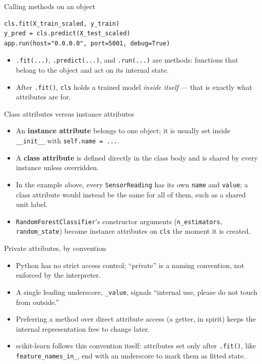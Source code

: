 \begin{frame}[fragile]{Calling methods on an object}
\begin{lstlisting}[style=coursepython]
cls.fit(X_train_scaled, y_train)
y_pred = cls.predict(X_test_scaled)
app.run(host="0.0.0.0", port=5001, debug=True)
\end{lstlisting}
\begin{itemize}
\item \texttt{.fit(...)}, \texttt{.predict(...)}, and \texttt{.run(...)} are methods: functions that belong to the object and act on its internal state.
\item After \texttt{.fit()}, \texttt{cls} holds a trained model \emph{inside itself} --- that is exactly what attributes are for.
\end{itemize}
\coursefooter
\end{frame}

\begin{frame}{Class attributes versus instance attributes}
\begin{itemize}
\item An \textbf{instance attribute} belongs to one object; it is usually set inside \texttt{\_\_init\_\_} with \texttt{self.name = ...}.
\item A \textbf{class attribute} is defined directly in the class body and is shared by every instance unless overridden.
\item In the example above, every \texttt{SensorReading} has its own \texttt{name} and \texttt{value}; a class attribute would instead be the same for all of them, such as a shared unit label.
\item \texttt{RandomForestClassifier}'s constructor arguments (\texttt{n\_estimators}, \texttt{random\_state}) become instance attributes on \texttt{cls} the moment it is created.
\end{itemize}
\coursefooter
\end{frame}

\begin{frame}{Private attributes, by convention}
\begin{itemize}
\item Python has no strict access control; ``private'' is a naming convention, not enforced by the interpreter.
\item A single leading underscore, \texttt{\_value}, signals ``internal use, please do not touch from outside.''
\item Preferring a method over direct attribute access (a getter, in spirit) keeps the internal representation free to change later.
\item scikit-learn follows this convention itself: attributes set only after \texttt{.fit()}, like \texttt{feature\_names\_in\_}, end with an underscore to mark them as fitted state.
\end{itemize}
\coursefooter
\end{frame}

